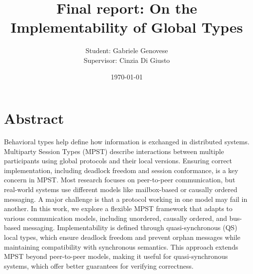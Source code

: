 \documentclass{article}
\title{Final report: On the Implementability of Global Types}
\author{Student: Gabriele Genovese\\Supervisor: Cinzia Di Giusto}
\date{\today}
\theoremstyle{definition}
\theoremstyle{definition}
\begin{document}
\maketitle

\section*{Abstract}
Behavioral types help define how information is exchanged in distributed systems.  
Multiparty Session Types (MPST) describe interactions between multiple participants  
using global protocols and their local versions. Ensuring correct implementation,  
including deadlock freedom and session conformance, is a key concern in MPST.  
Most research focuses on peer-to-peer communication, but real-world systems use  
different models like mailbox-based or causally ordered messaging. A major challenge  
is that a protocol working in one model may fail in another.  
In this work, we explore a flexible MPST framework that adapts to various communication models,
including unordered, causally ordered, and bus-based messaging. Implementability  
is defined through quasi-synchronous (QS) local types, which ensure deadlock freedom  
and prevent orphan messages while maintaining compatibility with synchronous semantics.  
This approach extends MPST beyond peer-to-peer models, making it useful for  
quasi-synchronous systems, which offer better guarantees for verifying correctness.

\newpage

\tableofcontents

\newpage









\newpage



\end{document}
